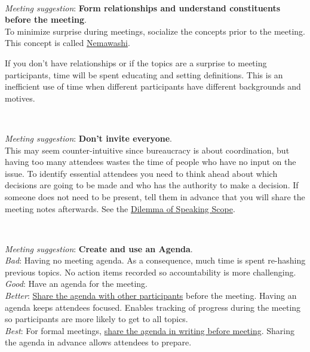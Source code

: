 \ \\
\begin{samepage}
\textit{Meeting suggestion}: \textbf{Form relationships and understand constituents before the meeting}.\\
To minimize surprise during meetings, socialize the concepts prior to the meeting. This concept is called 
\href{https://en.wikipedia.org/wiki/Nemawashi}{Nemawashi}.
\iftoggle{WPinmargin}{\marginpar{[Wikipedia] Nemawashi}}{}
\end{samepage}

If you don't have relationships or if the topics are a surprise to meeting participants, time will be spent educating and setting definitions. This is an inefficient use of time when different participants have different backgrounds and motives.

\ \\
\begin{samepage}
\textit{Meeting suggestion}: \textbf{Don't invite everyone}.\\
This may seem counter-intuitive since bureaucracy is about coordination, but having too many attendees wastes the time of people who have no input on the issue. 
To identify essential attendees you need to think ahead about which decisions are going to be made and who has the authority to make a decision. If someone does not need to be present, tell them in advance that you will share the meeting notes afterwards. See the \hyperref[table:dilemma-personal-scope-of-speaking]{Dilemma of Speaking Scope}.
\end{samepage}

\ \\
\begin{samepage}
\textit{Meeting suggestion}: \textbf{Create and use an Agenda}.\\
\textit{Bad}: Having no meeting agenda. As a consequence, much time is spent re-hashing previous topics. No action items recorded so accountability is more challenging. \\
\textit{Good}: Have an agenda for the meeting. \\
\textit{Better}: \underline{Share the agenda with other participants} before the meeting. Having an agenda keeps attendees focused.  Enables tracking of progress during the meeting so participants are more likely to get to all topics.\\
\textit{Best}: For formal meetings, \underline{share the agenda in writing before meeting}. Sharing the agenda in advance allows attendees to prepare.
\end{samepage}

